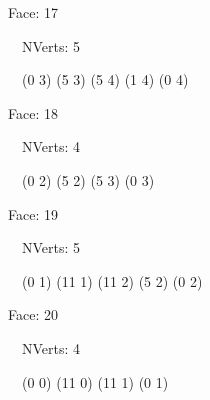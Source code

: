 \documentclass{article}
\begin{document}
{\footnotesize 

Face: 17

\   \    NVerts: 5

 \   \   (0 3) (5 3) (5 4) (1 4) (0 4)}

{\footnotesize 

Face: 18

\   \    NVerts: 4

 \   \   (0 2) (5 2) (5 3) (0 3)}

{\footnotesize 

Face: 19

\   \    NVerts: 5

 \   \   (0 1) (11 1) (11 2) (5 2) (0 2)}

{\footnotesize 

Face: 20

\   \    NVerts: 4

 \   \   (0 0) (11 0) (11 1) (0 1)}


 \newpage
\end{document}
